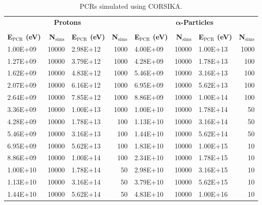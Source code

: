 \begin{table}
	\begin{center}
	\caption{PCRs simulated using CORSIKA.}
	\label{tab:CORSIKA_sims}
	\begin{tabular}{l r l r | l r l r}
		\hline
		\multicolumn{4}{c}{\bf Protons}  & \multicolumn{4}{c}{\textbf{ $\bm{\alpha}$-Particles}}         \\
		    &    &    &    &    &    &    &    \\
		{\bf E$\bm{_{\mathrm{PCR}}}$ (eV)} & {\bf N$\bm{_{\mathrm{sims}}}$} & {\bf E$\bm{_{\mathrm{PCR}}}$ (eV)} & {\bf N$\bm{_{\mathrm{sims}}}$} & {\bf E$\bm{_{\mathrm{PCR}}}$ (eV)} & {\bf N$\bm{_{\mathrm{sims}}}$} & {\bf E$\bm{_{\mathrm{PCR}}}$ (eV)} & {\bf N$\bm{_{\mathrm{sims}}}$} \\
		\hline
		1.00E+09    & 10000   & 2.98E+12    & 1000    & 4.00E+09    & 10000   & 1.00E+13    & 1000    \\
		1.27E+09    & 10000   & 3.79E+12    & 1000    & 4.28E+09    & 10000   & 1.78E+13    & 100     \\
		1.62E+09    & 10000   & 4.83E+12    & 1000    & 5.46E+09    & 10000   & 3.16E+13    & 100     \\
		2.07E+09    & 10000   & 6.16E+12    & 1000    & 6.95E+09    & 10000   & 5.62E+13    & 100     \\
		2.64E+09    & 10000   & 7.85E+12    & 1000    & 8.86E+09    & 10000   & 1.00E+14    & 100     \\
		3.36E+09    & 10000   & 1.00E+13    & 1000    & 1.00E+10    & 10000   & 1.78E+14    & 50      \\
		4.28E+09    & 10000   & 1.78E+13    & 100     & 1.13E+10    & 10000   & 3.16E+14    & 50      \\
		5.46E+09    & 10000   & 3.16E+13    & 100     & 1.44E+10    & 10000   & 5.62E+14    & 50      \\
		6.95E+09    & 10000   & 5.62E+13    & 100     & 1.83E+10    & 10000   & 1.00E+15    & 10      \\
		8.86E+09    & 10000   & 1.00E+14    & 100     & 2.34E+10    & 10000   & 1.78E+15    & 10      \\
		1.00E+10    & 10000   & 1.78E+14    & 50      & 2.98E+10    & 10000   & 3.16E+15    & 10      \\
		1.13E+10    & 10000   & 3.16E+14    & 50      & 3.79E+10    & 10000   & 5.62E+15    & 10      \\
		1.44E+10    & 10000   & 5.62E+14    & 50      & 4.83E+10    & 10000   & 1.00E+16    & 10      \\

\end{tabular}
\end{center}
\end{table}
